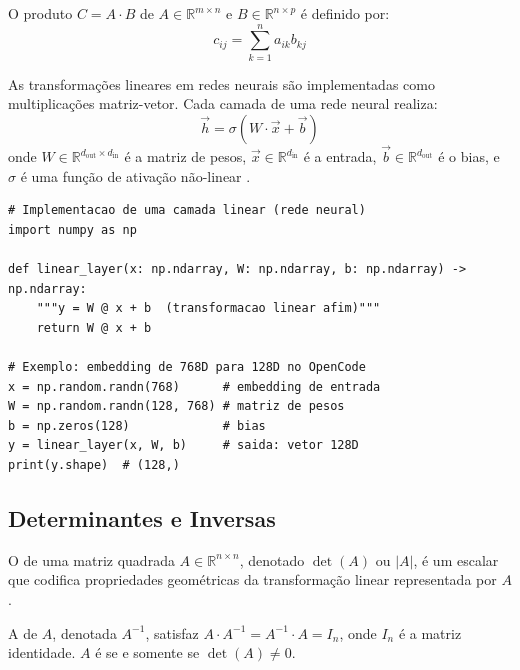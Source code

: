 \begin{definicao}
    O produto $C = A \cdot B$ de $A \in \mathbb{R}^{m \times n}$ e
    $B \in \mathbb{R}^{n \times p}$ é definido por:
    \[
    c_{ij} = \sum_{k=1}^{n} a_{ik} b_{kj}
    \]
\end{definicao}

\begin{exemplo}
    As transformações lineares em redes neurais são implementadas como
    multiplicações matriz-vetor. Cada camada de uma rede neural realiza:
    \[
    \vec{h} = \sigma(W \cdot \vec{x} + \vec{b})
    \]
    onde $W \in \mathbb{R}^{d_{\text{out}} \times d_{\text{in}}}$ é a matriz
    de pesos, $\vec{x} \in \mathbb{R}^{d_{\text{in}}}$ é a entrada,
    $\vec{b} \in \mathbb{R}^{d_{\text{out}}}$ é o bias, e $\sigma$ é uma
    função de ativação não-linear \cite{goodfellow2016deep}.
\end{exemplo}

\begin{lstlisting}[style=pythonstyle]
# Implementacao de uma camada linear (rede neural)
import numpy as np

def linear_layer(x: np.ndarray, W: np.ndarray, b: np.ndarray) -> np.ndarray:
    """y = W @ x + b  (transformacao linear afim)"""
    return W @ x + b

# Exemplo: embedding de 768D para 128D no OpenCode
x = np.random.randn(768)      # embedding de entrada
W = np.random.randn(128, 768) # matriz de pesos
b = np.zeros(128)             # bias
y = linear_layer(x, W, b)     # saida: vetor 128D
print(y.shape)  # (128,)
\end{lstlisting}

\subsection{Determinantes e Inversas}

\begin{definicao}[Determinante]
    O  de uma matriz quadrada $A \in \mathbb{R}^{n \times n}$,
    denotado $\det(A)$ ou $|A|$, é um escalar que codifica propriedades
    geométricas da transformação linear representada por $A$.
\end{definicao}

\begin{definicao}
    A  de $A$, denotada $A^{-1}$, satisfaz
    $A \cdot A^{-1} = A^{-1} \cdot A = I_n$, onde $I_n$ é a matriz
    identidade. $A$ é  se e somente se $\det(A) \neq 0$.
\end{definicao}

